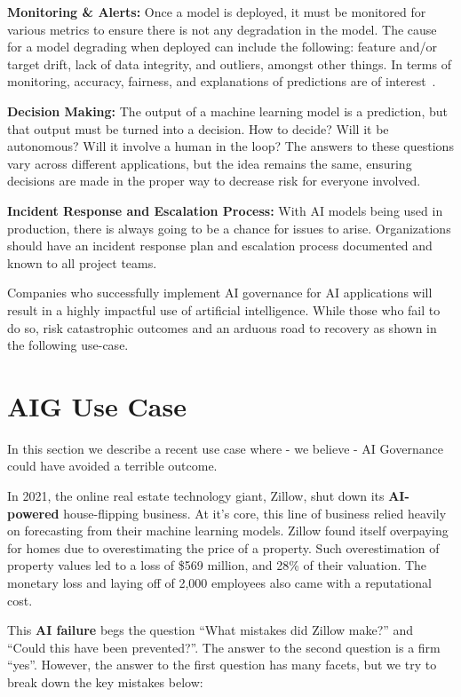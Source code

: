 \documentclass{article}
\begin{document}
\textbf{Monitoring \& Alerts:} Once a model is deployed, it must be monitored for various metrics to ensure there is not any degradation in the model. The cause for a model degrading when deployed can include the following: feature and/or target drift, lack of data integrity, and outliers, amongst other things. In terms of monitoring, accuracy, fairness, and explanations of predictions are of interest~\cite{amodei2016concrete, leike2017ai}. 

\textbf{Decision Making:} The output of a machine learning model is a prediction, but that output must be turned into a decision. How to decide? Will it be autonomous? Will it involve a human in the loop? The answers to these questions vary across different applications, but the idea remains the same, ensuring decisions are made in the proper way to decrease risk for everyone involved.

\textbf{Incident Response and Escalation Process:} With AI models being used in production, there is always going to be a chance for issues to arise. Organizations should have an incident response plan and escalation process documented and known to all project teams.

Companies who successfully implement AI governance for AI applications will result in a highly impactful use of artificial intelligence. While those who fail to do so, risk catastrophic outcomes and an arduous road to recovery as shown in the following use-case. 

\section{AIG Use Case}

In this section we describe a recent use case where - we believe - AI Governance could have avoided a terrible outcome. 

In 2021, the online real estate technology giant, Zillow, shut down its \textbf{AI-powered} house-flipping business.
At it's core, this line of business relied heavily on forecasting from their machine learning models.
Zillow found itself overpaying for homes due to overestimating the price of a property. 
Such overestimation of property values led to a loss of \$569 million, and 28\% of their valuation\cite{bloomberg, bloomberg2}. 
The monetary loss and laying off of 2,000 employees also came with a reputational cost.

This \textbf{AI failure} begs the question ``What mistakes did Zillow make?'' and ``Could this have been prevented?''. The answer to the second question is a firm ``yes''. However, the answer to the first question has many facets, but we try to break down the key mistakes below:
\end{document}
